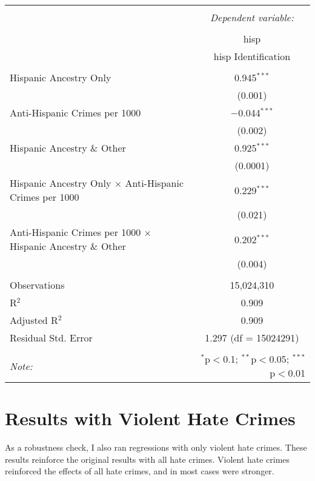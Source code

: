 \documentclass{article}
\begin{document}
    \begin{table}[!htbp] \centering 
      \caption{} 
      \label{} 
    \begin{tabular}{@{\extracolsep{5pt}}lc} 
    \\[-1.8ex]\hline 
    \hline \\[-1.8ex] 
     & \multicolumn{1}{c}{\textit{Dependent variable:}} \\ 
    \cline{2-2} 
    \\[-1.8ex] & hisp \\ 
     & hisp Identification \\ 
    \hline \\[-1.8ex] 
     Hispanic Ancestry Only & 0.945$^{***}$ \\ 
      & (0.001) \\ 
     Anti-Hispanic Crimes per 1000 & $-$0.044$^{***}$ \\ 
      & (0.002) \\ 
     Hispanic Ancestry \& Other & 0.925$^{***}$ \\ 
      & (0.0001) \\ 
     Hispanic Ancestry Only $\times$ Anti-Hispanic Crimes per 1000 & 0.229$^{***}$ \\ 
      & (0.021) \\ 
     Anti-Hispanic Crimes per 1000 $\times$ Hispanic Ancestry \& Other & 0.202$^{***}$ \\ 
      & (0.004) \\ 
    \hline \\[-1.8ex] 
    Observations & 15,024,310 \\ 
    R$^{2}$ & 0.909 \\ 
    Adjusted R$^{2}$ & 0.909 \\ 
    Residual Std. Error & 1.297 (df = 15024291) \\ 
    \hline 
    \hline \\[-1.8ex] 
    \textit{Note:}  & \multicolumn{1}{r}{$^{*}$p$<$0.1; $^{**}$p$<$0.05; $^{***}$p$<$0.01} \\ 
    \end{tabular} 
    \end{table} 


\newpage
\section{Results with Violent Hate Crimes}
    As a robustness check, I also ran regressions with only violent hate crimes. These results reinforce the original results with all hate crimes. Violent hate crimes reinforced the effects of all hate crimes, and in most cases were stronger. 
\end{document}
